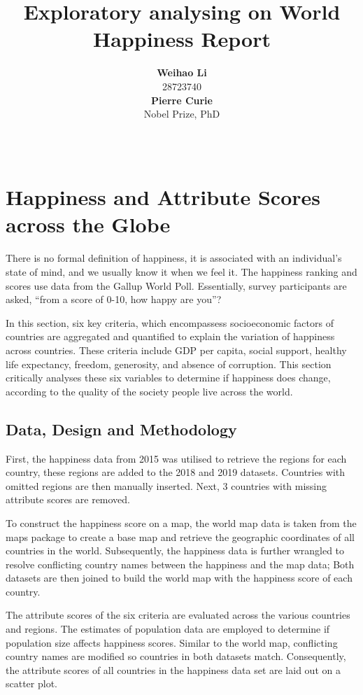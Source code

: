 \documentclass[11pt,a4paper,]{article}
\title{Exploratory analysing on World Happiness Report}
\author{\sf\Large\textbf{ Weihao Li}\\ {\sf\large 28723740\\[0.5cm]} \sf\Large\textbf{ Pierre Curie}\\ {\sf\large Nobel Prize, PhD\\[0.5cm]}}
\date{\sf\Date~\Month~\Year}
\makeatletter
\def\titlepage{\front{\expandafter{\@title}}{\@author}{\@organization}}
\makeatother
\begin{document}
\titlepage

\hypertarget{happiness-and-attribute-scores-across-the-globe}{%
\section{Happiness and Attribute Scores across the Globe}\label{happiness-and-attribute-scores-across-the-globe}}

There is no formal definition of happiness, it is associated with an individual's state of mind, and we usually know it when we feel it. The happiness ranking and scores use data from the Gallup World Poll. Essentially, survey participants are asked, ``from a score of 0-10, how happy are you''? \autocite{sachs2018world}

In this section, six key criteria, which encompassess socioeconomic factors of countries are aggregated and quantified to explain the variation of happiness across countries. These criteria include GDP per capita, social support, healthy life expectancy, freedom, generosity, and absence of corruption. This section critically analyses these six variables to determine if happiness does change, according to the quality of the society people live across the world.

\clearpage

\hypertarget{data-design-and-methodology}{%
\subsection{Data, Design and Methodology}\label{data-design-and-methodology}}

First, the happiness data from 2015 was utilised to retrieve the regions for each country, these regions are added to the 2018 and 2019 datasets. Countries with omitted regions are then manually inserted. Next, 3 countries with missing attribute scores are removed.

To construct the happiness score on a map, the world map data is taken from the maps package \autocite{maps} to create a base map and retrieve the geographic coordinates of all countries in the world. Subsequently, the happiness data is further wrangled to resolve conflicting country names between the happiness and the map data; Both datasets are then joined to build the world map with the happiness score of each country.

The attribute scores of the six criteria are evaluated across the various countries and regions. The estimates of population data are employed \autocite{wbstats} to determine if population size affects happiness scores. Similar to the world map, conflicting country names are modified so countries in both datasets match. Consequently, the attribute scores of all countries in the happiness data set are laid out on a scatter plot.
\end{document}
